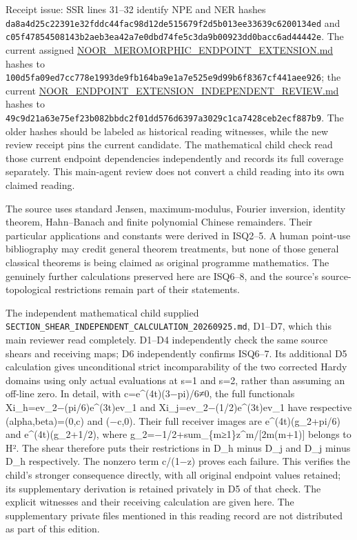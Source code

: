\documentclass[
]{article}
\newcounter{none} %
\begin{document}
Receipt issue: SSR lines 31--32 identify NPE and NER hashes \texttt{da8a4d25c22391e32fddc44fac98d12de515679f2d5b013ee33639c6200134ed} and \texttt{c05f47854508143b2aeb3ea42a7e0dbd74fe5c3da9b00923dd0bacc6ad44442e}. The current assigned \href{https://github.com/KokunoYumeto/zeta-function-research-reader/blob/main/workbenches/splitzero-tandem/continuations/20260925-source-endpoint-and-section/NOOR_MEROMORPHIC_ENDPOINT_EXTENSION.md}{NOOR\_MEROMORPHIC\_ENDPOINT\_EXTENSION.md} hashes to \texttt{100d5fa09ed7cc778e1993de9fb164ba9e1a7e525e9d99b6f8367cf441aee926}; the current \href{https://github.com/KokunoYumeto/zeta-function-research-reader/blob/main/workbenches/splitzero-tandem/continuations/20260925-source-endpoint-and-section/NOOR_ENDPOINT_EXTENSION_INDEPENDENT_REVIEW.md}{NOOR\_ENDPOINT\_EXTENSION\_INDEPENDENT\_REVIEW.md} hashes to \texttt{49c9d21a63e75ef23b082bbdc2f01dd576d6397a3029c1ca7428ceb2ecf887b9}. The older hashes should be labeled as historical reading witnesses, while the new review receipt pins the current candidate. The mathematical child check read those current endpoint dependencies independently and records its full coverage separately. This main-agent review does not convert a child reading into its own claimed reading.

The source uses standard Jensen, maximum-modulus, Fourier inversion, identity theorem, Hahn--Banach and finite polynomial Chinese remainders. Their particular applications and constants were derived in ISQ2--5. A human point-use bibliography may credit general theorem treatments, but none of those general classical theorems is being claimed as original programme mathematics. The genuinely further calculations preserved here are ISQ6--8, and the source's source-topological restrictions remain part of their statements.

The independent mathematical child supplied \texttt{SECTION\_SHEAR\_INDEPENDENT\_CALCULATION\_20260925.md}, D1--D7, which this main reviewer read completely. D1--D4 independently check the same source shears and receiving maps; D6 independently confirms ISQ6--7. Its additional D5 calculation gives unconditional strict incomparability of the two corrected Hardy domains using only actual evaluations at s=1 and s=2, rather than assuming an off-line zero. In detail, with c=e\^{}(4t)(3−pi)/6≠0, the full functionals Xi\_h=ev\_2−(pi/6)e\^{}(3t)ev\_1 and Xi\_j=ev\_2−(1/2)e\^{}(3t)ev\_1 have respective (alpha,beta)=(0,c) and (−c,0). Their full receiver images are e\^{}(4t)(g\_2+pi/6) and e\^{}(4t)(g\_2+1/2), where g\_2=−1/2+sum\_\{m≥1\}z\^{}m/{[}2m(m+1){]} belongs to H². The shear therefore puts their restrictions in D\_h minus D\_j and D\_j minus D\_h respectively. The nonzero term c/(1−z) proves each failure. This verifies the child's stronger consequence directly, with all original endpoint values retained; its supplementary derivation is retained privately in D5 of that check. The explicit witnesses and their receiving calculation are given here. The supplementary private files mentioned in this reading record are not distributed as part of this edition.
\end{document}
